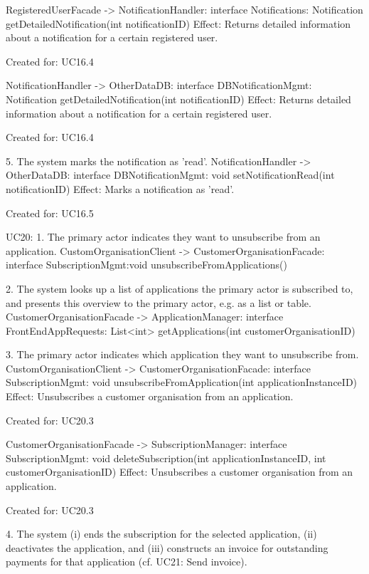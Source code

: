 {{{{{{{{{{{{{{            RegisteredUserFacade -> NotificationHandler: interface Notifications: Notification getDetailedNotification(int notificationID)
                Effect: Returns detailed information about a notification for a certain registered user.
                \item Created for: UC16.4

            NotificationHandler -> OtherDataDB: interface DBNotificationMgmt: Notification getDetailedNotification(int notificationID)
                Effect: Returns detailed information about a notification for a certain registered user.
                \item Created for: UC16.4


        5. The system marks the notification as 'read'.
            NotificationHandler -> OtherDataDB: interface DBNotificationMgmt: void setNotificationRead(int notificationID)
                Effect: Marks a notification as 'read'.
                \item Created for: UC16.5

        UC20:
            1. The primary actor indicates they want to unsubscribe from an application.
            CustomOrganisationClient -> CustomerOrganisationFacade: interface SubscriptionMgmt:void  unsubscribeFromApplications()


        2. The system looks up a list of applications the primary actor is subscribed to, and presents this
            overview to the primary actor, e.g. as a list or table.
            CustomerOrganisationFacade -> ApplicationManager: interface FrontEndAppRequests: List<int> getApplications(int customerOrganisationID)

        3. The primary actor indicates which application they want to unsubscribe from.
             CustomOrganisationClient -> CustomerOrganisationFacade: interface SubscriptionMgmt: void  unsubscribeFromApplication(int applicationInstanceID)
                 Effect: Unsubscribes a customer organisation from an application.
                 \item Created for: UC20.3

             CustomerOrganisationFacade -> SubscriptionManager: interface SubscriptionMgmt: void  deleteSubscription(int applicationInstanceID, int customerOrganisationID)
                 Effect: Unsubscribes a customer organisation from an application.
                 \item Created for: UC20.3

        4. The system (i) ends the subscription for the selected application,
           (ii) deactivates the application, and
           (iii) constructs an invoice for outstanding payments for that application (cf. UC21: Send invoice).

}}}}}}}}}}}}}}
